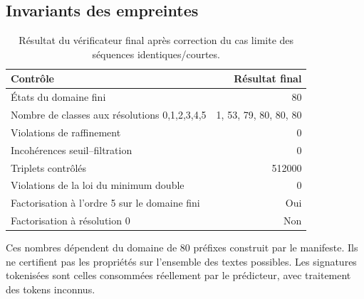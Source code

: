 \documentclass[11pt,a4paper]{article}
\begin{document}
\subsection{Invariants des empreintes}
\begin{table}[h!]\centering\begin{tabular}{lr}\toprule Contrôle & Résultat final \\
\midrule États du domaine fini & 80 \\
Nombre de classes aux résolutions 0,1,2,3,4,5 & 1, 53, 79, 80, 80, 80 \\
Violations de raffinement & 0 \\
Incohérences seuil--filtration & 0 \\
Triplets contrôlés & 512000 \\
Violations de la loi du minimum double & 0 \\
Factorisation à l'ordre 5 sur le domaine fini & Oui \\
Factorisation à résolution 0 & Non \\
\bottomrule\end{tabular}\caption{Résultat du vérificateur final après correction du cas limite des séquences identiques/courtes.}\end{table}
Ces nombres dépendent du domaine de 80 préfixes construit par le manifeste. Ils ne certifient pas les propriétés sur l'ensemble des textes possibles. Les signatures tokenisées sont celles consommées réellement par le prédicteur, avec traitement des tokens inconnus.
\end{document}
